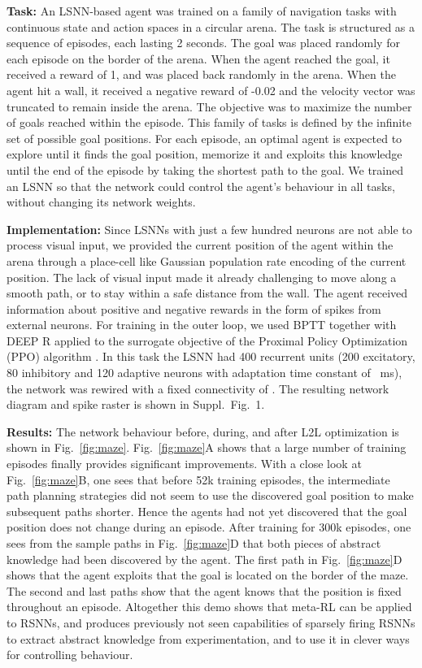 \documentclass{article} \pdfoutput=1
\begin{document}
\textbf{Task:} An LSNN-based agent was trained on a family of navigation tasks with continuous state and action spaces in a circular arena. The task is structured as a sequence of episodes, each lasting 2 seconds.
The goal was placed randomly for each episode on the border of the arena.
When the agent reached the goal, it received a reward of 1, and was placed back randomly in the arena.
When the agent hit a wall, it received a negative reward of -0.02 and the velocity vector was truncated to remain inside the arena.
The objective was to maximize the number of goals reached within the episode.
This family  of tasks is defined by the infinite set of possible goal positions.
For each episode, an optimal agent is expected to explore until it finds the goal position, memorize it and exploits this knowledge until the end of the episode by taking the shortest path to the goal. We trained an LSNN so that the network could control the agent's behaviour in all tasks, without changing its network weights.



\textbf{Implementation:}
Since LSNNs with just a few hundred neurons are not able to process visual input,
we provided the current position of the agent within the arena through a place-cell like Gaussian population rate encoding of the current position.
The lack of visual input made it already challenging to move along a smooth path, or to stay within a safe distance from the wall. 
The agent received information about positive and negative rewards in the form of spikes from external neurons.
For training in the outer loop, we used BPTT together with DEEP R applied to the surrogate objective of the Proximal Policy Optimization (PPO) algorithm \cite{schulman2017proximal}. 
In this task the LSNN had 400 recurrent units (200 excitatory, 80 inhibitory and 120 adaptive neurons with adaptation time constant  of ~ms), the network was rewired with a fixed connectivity of . The resulting network diagram and spike raster is shown in Suppl.~Fig.~1.


\textbf{Results:} The network behaviour before, during, and after L2L optimization is shown in Fig.~\ref{fig:maze}.
Fig.~\ref{fig:maze}A shows that a large number of training episodes finally provides significant improvements.
With a close look at Fig.~\ref{fig:maze}B, one sees that before 52k training episodes, the intermediate path planning strategies did not seem to use the discovered goal position to make subsequent paths shorter.
Hence the agents had not yet discovered that the goal position does not change during an episode.
After training for 300k episodes, one sees from the sample paths in Fig.~\ref{fig:maze}D that both pieces of abstract knowledge had been discovered by the agent. The first path in Fig.~\ref{fig:maze}D shows that the agent exploits that the goal is located on the border of the maze. The second and last paths show that the agent knows that the position is fixed throughout an episode.
Altogether this demo shows that meta-RL can be applied to RSNNs, and produces previously not seen capabilities of sparsely firing RSNNs to extract abstract knowledge from experimentation, and to use it in clever ways for controlling behaviour.
\end{document}
